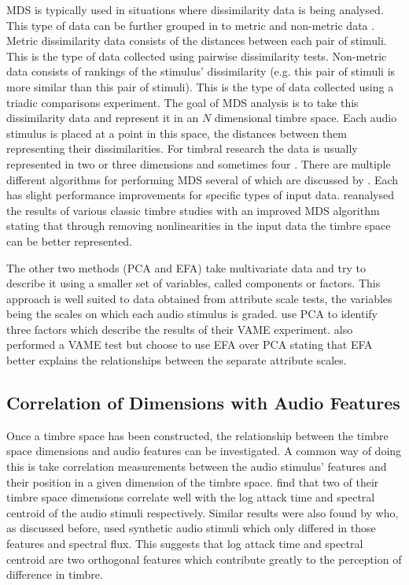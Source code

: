 		MDS is typically used in situations where dissimilarity data is being analysed. This type of data can be
		further grouped in to metric and non-metric data \citep{hair2013multivariate}. Metric dissimilarity data
		consists of the distances between each pair of stimuli. This is the type of data collected using pairwise
		dissimilarity tests. Non-metric data consists of rankings of the stimulus' dissimilarity (e.g. this pair of
		stimuli is more similar than this pair of stimuli). This is the type of data collected using a triadic
		comparisons experiment. The goal of MDS analysis is to take this dissimilarity data and represent it in an
		$N$ dimensional timbre space. Each audio stimulus is placed at a point in this space, the distances between
		them representing their dissimilarities. For timbral research the data is usually represented in two
		\citep{giragama2003relating} or three \citep{grey1978perceptual} dimensions and sometimes four
		\citep{bernays2011verbal}. There are multiple different algorithms for performing MDS several of which are
		discussed by \citet{mcadams1999perspectives}. Each has slight performance improvements for specific types
		of input data.  \citet{burgoyne2008a} reanalysed the results of various classic timbre studies with an
		improved MDS algorithm stating that through removing nonlinearities in the input data the timbre space can
		be better represented.

		The other two methods (PCA and EFA) take multivariate data and try to describe it using a smaller set of
		variables, called components or factors. This approach is well suited to data obtained from attribute scale
		tests, the variables being the scales on which each audio stimulus is graded. \citet{kendall1993verbal1}
		use PCA to identify three factors which describe the results of their VAME experiment.
		\citet{zacharakis2012analysis} also performed a VAME test but choose to use EFA over PCA stating that EFA
		better explains the relationships between the separate attribute scales.

	\subsection{Correlation of Dimensions with Audio Features}
	\label{sec:Timbre-DimensionalityReduction-DimensionCorrelations}
		Once a timbre space has been constructed, the relationship between the timbre space dimensions and audio
		features can be investigated. A common way of doing this is take correlation measurements between the audio
		stimulus' features and their position in a given dimension of the timbre space.
		\citet{mcadams1995perceptual} find that two of their timbre space dimensions correlate well with the log
		attack time and spectral centroid of the audio stimuli respectively. Similar results were also found by
		\citet{caclin2005acoustic} who, as discussed before, used synthetic audio stimuli which only differed in
		those features and spectral flux. This suggests that log attack time and spectral centroid are two
		orthogonal features which contribute greatly to the perception of difference in timbre.
		
